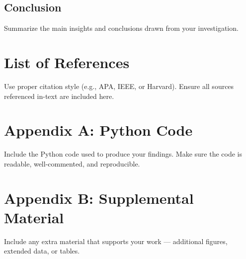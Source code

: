 \documentclass[12pt]{article}
\begin{document}
\subsection{Conclusion}
Summarize the main insights and conclusions drawn from your investigation.

\newpage
\section*{List of References}
Use proper citation style (e.g., APA, IEEE, or Harvard).  
Ensure all sources referenced in-text are included here.

\appendix

\section{Appendix A: Python Code}
Include the Python code used to produce your findings.  
Make sure the code is readable, well-commented, and reproducible.

\section{Appendix B: Supplemental Material}
Include any extra material that supports your work — additional figures, extended data, or tables.
\end{document}
